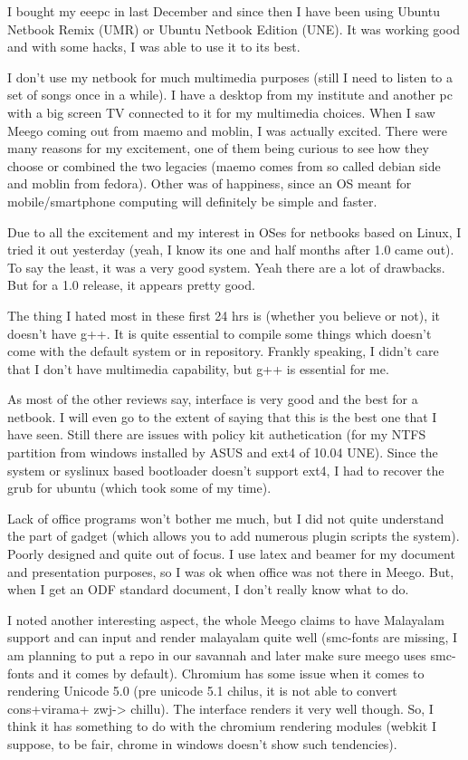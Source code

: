\vskip 2pt
{\engtext
I bought my eeepc in last December and since then I have been using Ubuntu Netbook Remix (UMR) or Ubuntu Netbook Edition (UNE). 
It was working good and with some hacks, I was able to use it to its best.

I don't use my netbook for much multimedia purposes (still I need to listen to a set of songs once in a while). 
I have a desktop from my institute and another pc with a big screen TV connected to it for my multimedia choices. 
When I saw Meego coming out from maemo and moblin, I was actually excited. There were many reasons for my excitement, 
one of them being curious to see how they choose or combined the two legacies (maemo comes from so called debian side and moblin from fedora).
Other was of happiness, since an OS meant for mobile/smartphone computing will definitely be simple and faster.

Due to all the excitement and my interest in OSes for netbooks based on Linux, I tried it out yesterday (yeah, I know its one and half months after 1.0 came out). To say the least, it was a very good system. 
Yeah there are a lot of drawbacks. But for a 1.0 release, it appears pretty good.

The thing I hated most in these first 24 hrs is (whether you believe or not), it doesn’t have g++. 
It is quite essential to compile some things which doesn’t come with the default system or in repository. 
Frankly speaking, I didn’t care that I don’t have multimedia capability, but g++ is essential for me.

As most of the other reviews say, interface is very good and the best for a netbook. I will even go to the extent of saying that this is the best one that I have seen. Still there are issues with policy kit authetication (for my NTFS partition from windows 
installed by ASUS and ext4 of 10.04 UNE). Since the system or syslinux based bootloader doesn’t support ext4, 
I had to recover the grub for ubuntu (which took some of my time).

Lack of office programs won't bother me much, but I did not quite understand the part of gadget (which allows you to add numerous 
plugin scripts the system). Poorly designed and quite out of focus. I use latex and beamer for my document and presentation 
purposes, so I was ok when office was not there in Meego. But, when I get an ODF standard document, 
I don’t really know what to do.

I noted another interesting aspect, the whole Meego claims to have Malayalam support and can input and render 
malayalam quite well (smc-fonts are missing, I am planning to put a repo in our savannah and later make sure 
meego uses smc-fonts and it comes by default). Chromium has some issue when it comes to rendering Unicode 
5.0 (pre unicode 5.1 chilus, it is not able to convert cons+virama+ zwj-> chillu). 
The interface renders it very well though. So, I think it has something to do with the chromium 
rendering modules (webkit I suppose, to be fair, chrome in windows doesn’t show such tendencies).

}
